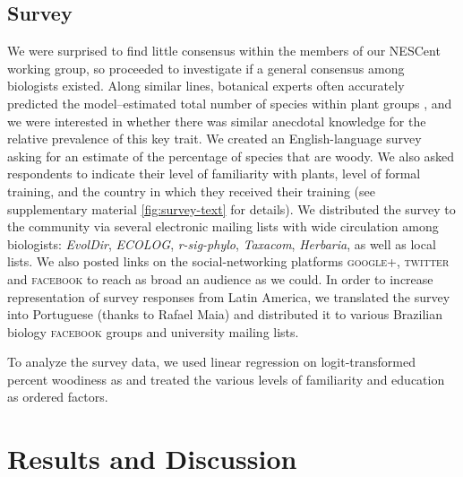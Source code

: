 \documentclass[12pt]{article}
\begin{document}
\subsection{Survey}

We were surprised to find little consensus within the members of our NESCent working group,
so proceeded to investigate if a general consensus among
biologists existed.
% 
Along similar lines, botanical experts often accurately predicted the
model--estimated total number of species within plant groups \citep{joppa2010} , and we were interested in whether there was similar anecdotal knowledge for the relative prevalence of
this key trait.
%
We created an English-language survey asking for an estimate of the
percentage of species that are woody.  We also asked respondents to
indicate their level of familiarity with plants, level of formal
training, and the country in which they received their training (see
supplementary material \ref{fig:survey-text} for details).
We distributed the survey to the community via several electronic
mailing lists with wide circulation among biologists: \emph{EvolDir},
\emph{ECOLOG}, \emph{r-sig-phylo}, \emph{Taxacom}, \emph{Herbaria}, as
well as local lists. We also posted links on the social-networking platforms \textsc{google+},
\textsc{twitter} and \textsc{facebook} to reach as broad an audience
as we could.
In order to increase representation of survey responses from Latin
America, we translated the survey into Portuguese (thanks to Rafael
Maia) and distributed it to various Brazilian biology
\textsc{facebook} groups and university mailing lists.

To analyze the survey data, we used linear regression on logit-transformed percent woodiness as  \citep[for discussion as to why we used logit--transform, see][]{wartonarcsine} and treated the various levels of familiarity and education as ordered factors.


\section{Results and Discussion}
\end{document}
